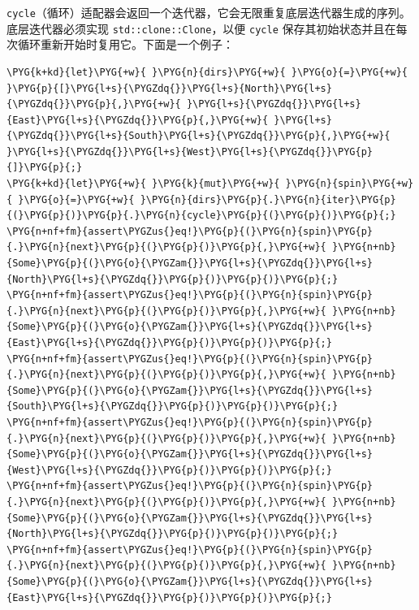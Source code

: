 \texttt{cycle}（循环）适配器会返回一个迭代器，它会无限重复底层迭代器生成的序列。底层迭代器必须实现 \texttt{std::clone::Clone}，以便 \texttt{cycle} 保存其初始状态并且在每次循环重新开始时复用它。下面是一个例子：

\begin{Verbatim}[commandchars=\\\{\},breaklines=true,breakanywhere=true,fontsize=\codefont,xleftmargin=17bp]
\PYG{k+kd}{let}\PYG{+w}{ }\PYG{n}{dirs}\PYG{+w}{ }\PYG{o}{=}\PYG{+w}{ }\PYG{p}{[}\PYG{l+s}{\PYGZdq{}}\PYG{l+s}{North}\PYG{l+s}{\PYGZdq{}}\PYG{p}{,}\PYG{+w}{ }\PYG{l+s}{\PYGZdq{}}\PYG{l+s}{East}\PYG{l+s}{\PYGZdq{}}\PYG{p}{,}\PYG{+w}{ }\PYG{l+s}{\PYGZdq{}}\PYG{l+s}{South}\PYG{l+s}{\PYGZdq{}}\PYG{p}{,}\PYG{+w}{ }\PYG{l+s}{\PYGZdq{}}\PYG{l+s}{West}\PYG{l+s}{\PYGZdq{}}\PYG{p}{]}\PYG{p}{;}
\PYG{k+kd}{let}\PYG{+w}{ }\PYG{k}{mut}\PYG{+w}{ }\PYG{n}{spin}\PYG{+w}{ }\PYG{o}{=}\PYG{+w}{ }\PYG{n}{dirs}\PYG{p}{.}\PYG{n}{iter}\PYG{p}{(}\PYG{p}{)}\PYG{p}{.}\PYG{n}{cycle}\PYG{p}{(}\PYG{p}{)}\PYG{p}{;}
\PYG{n+nf+fm}{assert\PYGZus{}eq!}\PYG{p}{(}\PYG{n}{spin}\PYG{p}{.}\PYG{n}{next}\PYG{p}{(}\PYG{p}{)}\PYG{p}{,}\PYG{+w}{ }\PYG{n+nb}{Some}\PYG{p}{(}\PYG{o}{\PYGZam{}}\PYG{l+s}{\PYGZdq{}}\PYG{l+s}{North}\PYG{l+s}{\PYGZdq{}}\PYG{p}{)}\PYG{p}{)}\PYG{p}{;}
\PYG{n+nf+fm}{assert\PYGZus{}eq!}\PYG{p}{(}\PYG{n}{spin}\PYG{p}{.}\PYG{n}{next}\PYG{p}{(}\PYG{p}{)}\PYG{p}{,}\PYG{+w}{ }\PYG{n+nb}{Some}\PYG{p}{(}\PYG{o}{\PYGZam{}}\PYG{l+s}{\PYGZdq{}}\PYG{l+s}{East}\PYG{l+s}{\PYGZdq{}}\PYG{p}{)}\PYG{p}{)}\PYG{p}{;}
\PYG{n+nf+fm}{assert\PYGZus{}eq!}\PYG{p}{(}\PYG{n}{spin}\PYG{p}{.}\PYG{n}{next}\PYG{p}{(}\PYG{p}{)}\PYG{p}{,}\PYG{+w}{ }\PYG{n+nb}{Some}\PYG{p}{(}\PYG{o}{\PYGZam{}}\PYG{l+s}{\PYGZdq{}}\PYG{l+s}{South}\PYG{l+s}{\PYGZdq{}}\PYG{p}{)}\PYG{p}{)}\PYG{p}{;}
\PYG{n+nf+fm}{assert\PYGZus{}eq!}\PYG{p}{(}\PYG{n}{spin}\PYG{p}{.}\PYG{n}{next}\PYG{p}{(}\PYG{p}{)}\PYG{p}{,}\PYG{+w}{ }\PYG{n+nb}{Some}\PYG{p}{(}\PYG{o}{\PYGZam{}}\PYG{l+s}{\PYGZdq{}}\PYG{l+s}{West}\PYG{l+s}{\PYGZdq{}}\PYG{p}{)}\PYG{p}{)}\PYG{p}{;}
\PYG{n+nf+fm}{assert\PYGZus{}eq!}\PYG{p}{(}\PYG{n}{spin}\PYG{p}{.}\PYG{n}{next}\PYG{p}{(}\PYG{p}{)}\PYG{p}{,}\PYG{+w}{ }\PYG{n+nb}{Some}\PYG{p}{(}\PYG{o}{\PYGZam{}}\PYG{l+s}{\PYGZdq{}}\PYG{l+s}{North}\PYG{l+s}{\PYGZdq{}}\PYG{p}{)}\PYG{p}{)}\PYG{p}{;}
\PYG{n+nf+fm}{assert\PYGZus{}eq!}\PYG{p}{(}\PYG{n}{spin}\PYG{p}{.}\PYG{n}{next}\PYG{p}{(}\PYG{p}{)}\PYG{p}{,}\PYG{+w}{ }\PYG{n+nb}{Some}\PYG{p}{(}\PYG{o}{\PYGZam{}}\PYG{l+s}{\PYGZdq{}}\PYG{l+s}{East}\PYG{l+s}{\PYGZdq{}}\PYG{p}{)}\PYG{p}{)}\PYG{p}{;}
\end{Verbatim}


